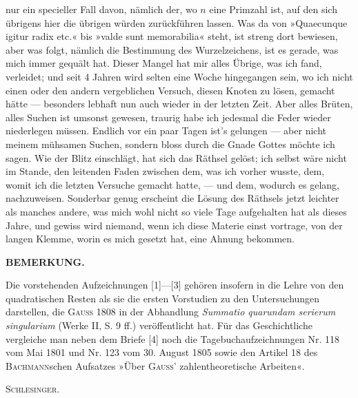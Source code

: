 \noindent nur ein specieller Fall davon, nämlich der, wo $n$ eine Primzahl ist, auf den sich übrigens hier die übrigen würden zurückführen lassen. Was da von »Quaecunque igitur radix etc.« bis »valde sunt memorabilia« steht, ist streng dort bewiesen, aber was folgt, nämlich die Bestimmung des Wurzelzeichens, ist es gerade, was mich immer gequält hat. Dieser Mangel hat mir alles Übrige, was ich fand, verleidet; und seit 4 Jahren wird selten eine Woche hingegangen sein, wo ich nicht einen oder den andern vergeblichen Versuch, diesen Knoten zu lösen, gemacht hätte — besonders lebhaft nun auch wieder in der letzten Zeit. Aber alles Brüten, alles Suchen ist umsonst gewesen, traurig habe ich jedesmal die Feder wieder niederlegen müssen. Endlich vor ein paar Tagen ist's gelungen — aber nicht meinem mühsamen Suchen, sondern bloss durch die Gnade Gottes möchte ich sagen. Wie der Blitz einschlägt, hat sich das Räthsel gelöst; ich selbst wäre nicht im Stande, den leitenden Faden zwischen dem, was ich vorher wusste, dem, womit ich die letzten Versuche gemacht hatte, — und dem, wodurch es gelang, nachzuweisen. Sonderbar genug erscheint die Lösung des Räthsels jetzt leichter als manches andere, was mich wohl nicht so viele Tage aufgehalten hat als dieses Jahre, und gewiss wird niemand, wenn ich diese Materie einst vortrage, von der langen Klemme, worin es mich gesetzt hat, eine Ahnung bekommen.
\par\medskip\noindent{}
\bigskip
\begin{center}\textbf{BEMERKUNG.}\end{center}
\begingroup\small
\par\indent Die vorstehenden Aufzeichnungen [1]—[3] gehören insofern in die Lehre von den quadratischen Resten als sie die ersten Vorstudien zu den Untersuchungen darstellen, die \textsc{Gauss} 1808 in der Abhandlung \textit{Summatio quarundam serierum singularium} (Werke II, S. 9 ff.) veröffentlicht hat. Für das Geschichtliche vergleiche man neben dem Briefe [4] noch die Tagebuchaufzeichnungen Nr. 118 vom Mai 1801 und Nr. 123 vom 30. August 1805 sowie den Artikel 18 des \textsc{Bachmann}schen Aufsatzes »Über \textsc{Gauss}' zahlentheoretische Arbeiten«.
\begin{flushright}\textsc{Schlesinger.}\end{flushright}
\ClosingRule\clearpage
\endgroup
